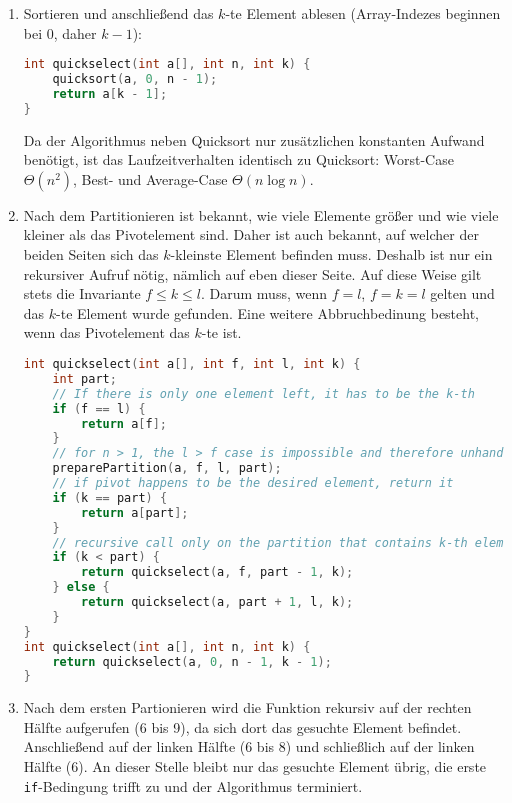 \documentclass[11pt,a4paper]{article}
\begin{document}
\begin{loesung}
    
    \begin{enumerate}
        \item Sortieren und anschließend das $k$-te Element ablesen (Array-Indezes beginnen bei 0, daher $k - 1$):
        \begin{lstlisting}[language=c++]
int quickselect(int a[], int n, int k) {
    quicksort(a, 0, n - 1);
    return a[k - 1];
}
        \end{lstlisting}
        Da der Algorithmus neben Quicksort nur zusätzlichen konstanten Aufwand benötigt, ist das Laufzeitverhalten identisch zu Quicksort: Worst-Case $\Theta(n^2)$, Best- und Average-Case $\Theta(n \log n)$.

        \item
        Nach dem Partitionieren ist bekannt, wie viele Elemente größer und wie viele kleiner als das Pivotelement sind.
        Daher ist auch bekannt, auf welcher der beiden Seiten sich das $k$-kleinste Element befinden muss.
        Deshalb ist nur ein rekursiver Aufruf nötig, nämlich auf eben dieser Seite.
        Auf diese Weise gilt stets die Invariante $f \leq k \leq l$.
        Darum muss, wenn $f = l$, $f = k = l$ gelten und das $k$-te Element wurde gefunden.
        Eine weitere Abbruchbedinung besteht, wenn das Pivotelement das $k$-te ist.
        \begin{lstlisting}[language=c++]
int quickselect(int a[], int f, int l, int k) {
    int part;
    // If there is only one element left, it has to be the k-th
    if (f == l) {
        return a[f];
    }
    // for n > 1, the l > f case is impossible and therefore unhandled
    preparePartition(a, f, l, part);
    // if pivot happens to be the desired element, return it
    if (k == part) {
        return a[part];
    }
    // recursive call only on the partition that contains k-th element
    if (k < part) {
        return quickselect(a, f, part - 1, k);
    } else {
        return quickselect(a, part + 1, l, k);
    }
}
int quickselect(int a[], int n, int k) {
    return quickselect(a, 0, n - 1, k - 1);
}
        \end{lstlisting}

        \item
        Nach dem ersten Partionieren wird die Funktion rekursiv auf der rechten Hälfte aufgerufen (6 bis 9), da sich dort das gesuchte Element befindet.
        Anschließend auf der linken Hälfte (6 bis 8) und schließlich auf der linken Hälfte (6).
        An dieser Stelle bleibt nur das gesuchte Element übrig, die erste \texttt{if}-Bedingung trifft zu und der Algorithmus terminiert.


\end{enumerate}
\end{loesung}
\end{document}
